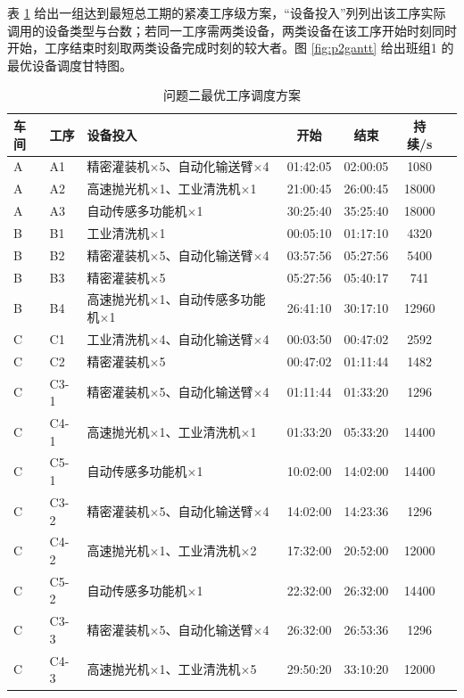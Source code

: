 \documentclass[12pt,a4paper]{article}
\begin{document}
表 \ref{tab:p2schedule} 给出一组达到最短总工期的紧凑工序级方案，“设备投入”列列出该工序实际调用的设备类型与台数；若同一工序需两类设备，两类设备在该工序开始时刻同时开始，工序结束时刻取两类设备完成时刻的较大者。图 \ref{fig:p2gantt} 给出班组1 的最优设备调度甘特图。

\begin{table}[H]
\centering
\caption{问题二最优工序调度方案}
\small
\label{tab:p2schedule}
\begin{tabular}{lllcccc}
\toprule
车间 & 工序 & 设备投入 & 开始 & 结束 & 持续/s \\
\midrule
A & A1 & 精密灌装机$\times$5、自动化输送臂$\times$4 & 01:42:05 & 02:00:05 & 1080 \\
A & A2 & 高速抛光机$\times$1、工业清洗机$\times$1 & 21:00:45 & 26:00:45 & 18000 \\
A & A3 & 自动传感多功能机$\times$1 & 30:25:40 & 35:25:40 & 18000 \\
\midrule
B & B1 & 工业清洗机$\times$1 & 00:05:10 & 01:17:10 & 4320 \\
B & B2 & 精密灌装机$\times$5、自动化输送臂$\times$4 & 03:57:56 & 05:27:56 & 5400 \\
B & B3 & 精密灌装机$\times$5 & 05:27:56 & 05:40:17 & 741 \\
B & B4 & 高速抛光机$\times$1、自动传感多功能机$\times$1 & 26:41:10 & 30:17:10 & 12960 \\
\midrule
C & C1 & 工业清洗机$\times$4、自动化输送臂$\times$4 & 00:03:50 & 00:47:02 & 2592 \\
C & C2 & 精密灌装机$\times$5 & 00:47:02 & 01:11:44 & 1482 \\
C & C3-1 & 精密灌装机$\times$5、自动化输送臂$\times$4 & 01:11:44 & 01:33:20 & 1296 \\
C & C4-1 & 高速抛光机$\times$1、工业清洗机$\times$1 & 01:33:20 & 05:33:20 & 14400 \\
C & C5-1 & 自动传感多功能机$\times$1 & 10:02:00 & 14:02:00 & 14400 \\
C & C3-2 & 精密灌装机$\times$5、自动化输送臂$\times$4 & 14:02:00 & 14:23:36 & 1296 \\
C & C4-2 & 高速抛光机$\times$1、工业清洗机$\times$2 & 17:32:00 & 20:52:00 & 12000 \\
C & C5-2 & 自动传感多功能机$\times$1 & 22:32:00 & 26:32:00 & 14400 \\
C & C3-3 & 精密灌装机$\times$5、自动化输送臂$\times$4 & 26:32:00 & 26:53:36 & 1296 \\
C & C4-3 & 高速抛光机$\times$1、工业清洗机$\times$5 & 29:50:20 & 33:10:20 & 12000 \\

\end{tabular}
\end{table}
\end{document}
